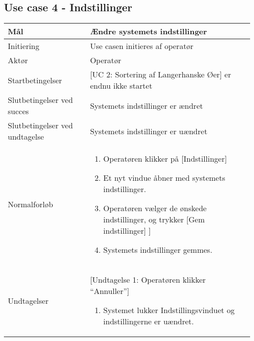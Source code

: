 \subsection{Use case 4 - Indstillinger}
\begin{center}
		\begin{longtable}{ | m{4cm} | m{8cm}| } 
			\hline
			Mål & Ændre systemets indstillinger \\ 
			\hline
			Initiering &  Use casen initieres af operatør\\
			\hline
			Aktør & Operatør \\ 
			\hline
			Startbetingelser & [UC 2: Sortering af Langerhanske Øer] er endnu ikke startet\\ 
			\hline	
			Slutbetingelser ved succes & Systemets indstillinger er ændret \\
			\hline
			Slutbetingelser ved undtagelse & Systemets indstillinger er uændret \\
			\hline
			Normalforløb & \begin{enumerate}
				\item Operatøren klikker på [Indstillinger]
				\item Et nyt vindue åbner med systemets indstillinger.
				\item Operatøren vælger de ønskede indstillinger, og trykker [Gem indstillinger]
				\subitem [Undtagelse 1: Operatøren klikker [Annuller]]
				\item Systemets indstillinger gemmes.
			\end{enumerate} \\ 
			\hline
			Undtagelser & [Undtagelse 1: Operatøren klikker “Annuller”]
			
			\begin{enumerate}
			\item Systemet lukker Indstillingsvinduet og indstillingerne er uændret.
			\end{enumerate} \\
			\hline
		\end{longtable}
		
	\end{center}
	\pagebreak